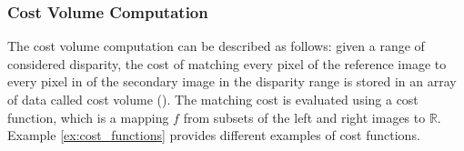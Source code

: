 \subsubsection{Cost Volume Computation}\label{sec:cost_volume_computation}
The cost volume computation can be described as follows: given a range of considered disparity, the cost of matching every pixel of the reference image to every pixel in of the secondary image in the disparity range is stored in an array of data called cost volume (). The matching cost is evaluated using a cost function, which is a mapping $f$ from subsets of the left and right images to $\mathbb{R}$. Example \ref{ex:cost_functions} provides different examples of cost functions.

